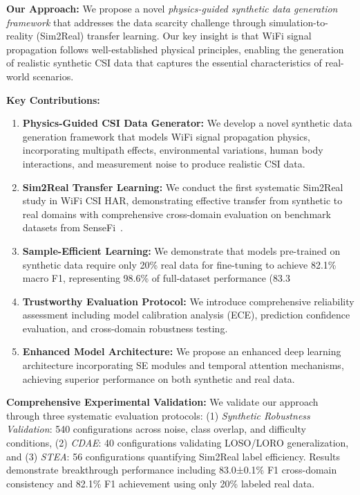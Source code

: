 \documentclass[journal]{IEEEtran}
\begin{document}
\textbf{Our Approach:} We propose a novel \textit{physics-guided synthetic data generation framework} that addresses the data scarcity challenge through simulation-to-reality (Sim2Real) transfer learning. Our key insight is that WiFi signal propagation follows well-established physical principles, enabling the generation of realistic synthetic CSI data that captures the essential characteristics of real-world scenarios.

\textbf{Key Contributions:}
\begin{enumerate}
\item \textbf{Physics-Guided CSI Data Generator:} We develop a novel synthetic data generation framework that models WiFi signal propagation physics, incorporating multipath effects, environmental variations, human body interactions, and measurement noise to produce realistic CSI data.

\item \textbf{Sim2Real Transfer Learning:} We conduct the first systematic Sim2Real study in WiFi CSI HAR, demonstrating effective transfer from synthetic to real domains with comprehensive cross-domain evaluation on benchmark datasets from SenseFi~\cite{yang2023sensefi}.

\item \textbf{Sample-Efficient Learning:} We demonstrate that models pre-trained on synthetic data require only 20\% real data for fine-tuning to achieve 82.1\% macro F1, representing 98.6\% of full-dataset performance (83.3%

\item \textbf{Trustworthy Evaluation Protocol:} We introduce comprehensive reliability assessment including model calibration analysis (ECE), prediction confidence evaluation, and cross-domain robustness testing.

\item \textbf{Enhanced Model Architecture:} We propose an enhanced deep learning architecture incorporating SE modules and temporal attention mechanisms, achieving superior performance on both synthetic and real data.
\end{enumerate}

\textbf{Comprehensive Experimental Validation:} We validate our approach through three systematic evaluation protocols: (1) \textit{Synthetic Robustness Validation}: 540 configurations across noise, class overlap, and difficulty conditions, (2) \textit{CDAE}: 40 configurations validating LOSO/LORO generalization, and (3) \textit{STEA}: 56 configurations quantifying Sim2Real label efficiency. Results demonstrate breakthrough performance including 83.0±0.1\% F1 cross-domain consistency and 82.1\% F1 achievement using only 20\% labeled real data.
\end{document}
